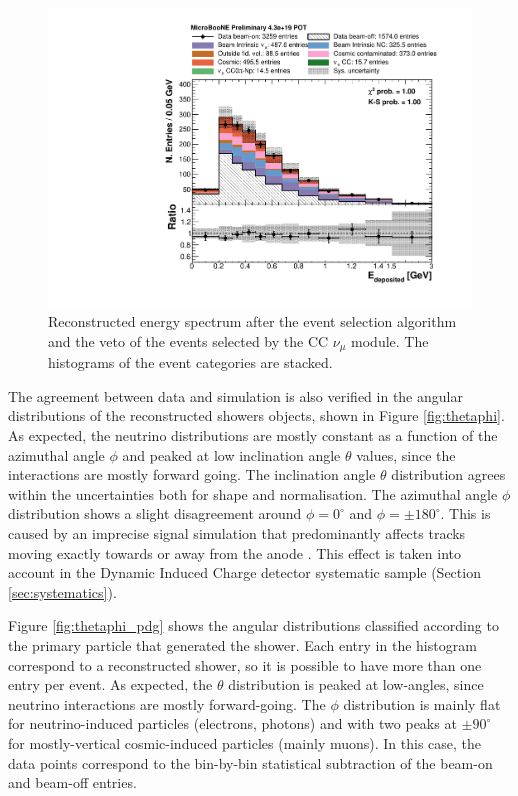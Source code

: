 \begin{figure}[htbp]
\centering
  \includegraphics[width=0.65\linewidth]{figures/h_fixed_energy.pdf}
  \caption{Reconstructed energy spectrum after the event selection algorithm and the veto of the events selected by the CC $\nu_{\mu}$ module. The histograms of the event categories are stacked.}
  \label{fig:spectrum}
\end{figure}

The agreement between data and simulation is also verified in the angular distributions of the reconstructed showers objects, shown in Figure \ref{fig:thetaphi}. As expected, the neutrino distributions are mostly constant as a function of the azimuthal angle $\phi$ and peaked at low inclination angle $\theta$ values, since the interactions are mostly forward going. The inclination angle $\theta$ distribution agrees within the uncertainties both for shape and normalisation. The azimuthal angle $\phi$ distribution shows a slight disagreement around $\phi = 0^{\circ}$ and $\phi = \pm180^{\circ}$. This is caused by an imprecise signal simulation that predominantly affects tracks moving exactly towards or away from the anode \cite{Adams:2018gbi}. This effect is taken into account in the Dynamic Induced Charge detector systematic sample (Section \ref{sec:systematics}). 

Figure \ref{fig:thetaphi_pdg} shows the angular distributions classified according to the primary particle that generated the shower. Each entry in the histogram correspond to a reconstructed shower, so it is possible to have more than one entry per event. As expected, the $\theta$ distribution is peaked at low-angles, since neutrino interactions are mostly forward-going. The $\phi$ distribution is mainly flat for neutrino-induced particles (electrons, photons) and with two peaks at $\pm90^{\circ}$ for mostly-vertical cosmic-induced particles (mainly muons). In this case, the data points correspond to the bin-by-bin statistical subtraction of the beam-on and beam-off entries.

